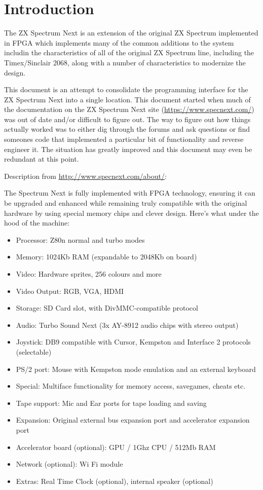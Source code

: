 \chapter{Introduction}
\begin{multicols}{2}
The ZX Spectrum Next is an extension of the original ZX Spectrum
implemented in FPGA which implements many of the common additions to
the system includin the characteristics of all of the original ZX
Spectrum line, including the Timex/Sinclair 2068, along with a number
of characteristics to modernize the design.

This document is an attempt to consolidate the programming interface
for the ZX Spectrum Next into a single location. This document started
when much of the documentation on the ZX Spectrum Next site
(\url{https://www.specnext.com/}) was out of date and/or difficult to figure
out. The way to figure out how things actually worked was to either
dig through the forums and ask questions or find someones code that
implemented a particular bit of functionality and reverse engineer
it. The situation has greatly improved and this document may even be
redundant at this point.

Description from \url{http://www.specnext.com/about/}:

The Spectrum Next is fully implemented with FPGA technology, ensuring
it can be upgraded and enhanced while remaining truly compatible with
the original hardware by using special memory chips and clever
design. Here’s what under the hood of the machine:

\begin{itemize}
\item Processor: Z80n normal and turbo modes
\item Memory: 1024Kb RAM (expandable to 2048Kb on board)
\item Video: Hardware sprites, 256 colours and more
\item Video Output: RGB, VGA, HDMI
\item Storage: SD Card slot, with DivMMC-compatible protocol
\item Audio: Turbo Sound Next (3x AY-8912 audio chips with stereo
  output)
\item Joystick: DB9 compatible with Cursor, Kempston and Interface 2
  protocols (selectable)
\item PS/2 port: Mouse with Kempston mode emulation and an external
  keyboard
\item Special: Multiface functionality for memory access, savegames,
  cheats etc.
\item Tape support: Mic and Ear ports for tape loading and saving
\item Expansion: Original external bus expansion port and accelerator
  expansion port
\item Accelerator board (optional): GPU / 1Ghz CPU / 512Mb RAM
\item Network (optional): Wi Fi module
\item Extras: Real Time Clock (optional), internal speaker (optional)
\end{itemize}
\end{multicols}
